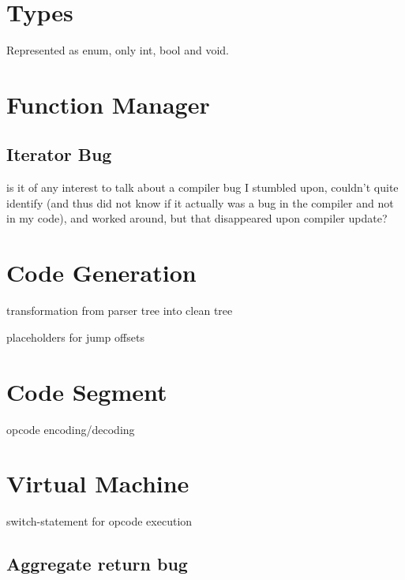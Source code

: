     \section{Types}
        
        Represented as enum, only int, bool and void.
    
    \section{Function Manager}
    
        
        \subsection{Iterator Bug}
            
            is it of any interest to talk about a compiler bug I stumbled upon, couldn't quite identify (and thus did not know if it actually was a bug in the compiler and not in my code), and worked around, but that disappeared upon compiler update?
    
    \section{Code Generation}
    
        transformation from parser tree into clean tree
    
        placeholders for jump offsets
        
    \section{Code Segment}
        
        opcode encoding/decoding
        
    \section{Virtual Machine}
        
        switch-statement for opcode execution
        
        \subsection{Aggregate return bug}

